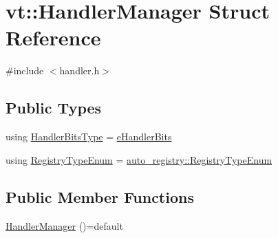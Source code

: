 \hypertarget{structvt_1_1_handler_manager}{}\section{vt\+:\+:Handler\+Manager Struct Reference}
\label{structvt_1_1_handler_manager}


{\ttfamily \#include $<$handler.\+h$>$}

\subsection*{Public Types}
\begin{DoxyCompactItemize}
\item 
using \hyperlink{structvt_1_1_handler_manager_ac2c93e168ab703b2441e0c38aa28a08f}{Handler\+Bits\+Type} = \hyperlink{namespacevt_af182285b57b225b163d5d8aff03cb8c2}{e\+Handler\+Bits}
\item 
using \hyperlink{structvt_1_1_handler_manager_acebe6230345d7f90400ebe75168aaa0a}{Registry\+Type\+Enum} = \hyperlink{namespacevt_1_1auto__registry_a9f369ca2b484130b396729e2ddf05241}{auto\+\_\+registry\+::\+Registry\+Type\+Enum}
\end{DoxyCompactItemize}
\subsection*{Public Member Functions}
\begin{DoxyCompactItemize}
\item 
\hyperlink{structvt_1_1_handler_manager_ab14c2718685b0ecd93d39b129c597ec9}{Handler\+Manager} ()=default
\end{DoxyCompactItemize}
